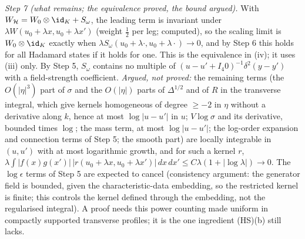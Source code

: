 \emph{Step 7 (what remains; the equivalence proved, the bound argued).} With $W_{\mathcal{H}} = W_{0}\otimes\id_{K} + S_{\omega}$, the leading term is invariant under $\lambda W(u_{0} + \lambda x, u_{0} + \lambda x')$ (weight $\tfrac12$ per leg; computed), so the scaling limit is $W_{0}\otimes\id_{K}$ exactly when $\lambda S_{\omega}(u_{0} + \lambda\cdot, u_{0} + \lambda\cdot) \to 0$, and by Step 6 this holds for all Hadamard states if it holds for one. This is the equivalence in (iv); it uses (iii) only. By Step 5, $S_{\omega}$ contains no multiple of $(u - u' + I_{4}0)^{-1}\delta^{2}(y - y')$ with a field-strength coefficient. \emph{Argued, not proved:} the remaining terms (the $O(|\eta|^{3})$ part of $\sigma$ and the $O(|\eta|)$ parts of $\Delta^{1/2}$ and of $R$ in the transverse integral, which give kernels homogeneous of degree $\ge -2$ in $\eta$ without a derivative along $k$, hence at most $\log|u - u'|$ in $u$; $V\log\sigma$ and its derivative, bounded times $\log$; the mass term, at most $\log|u - u'|$; the log-order expansion and connection terms of Step 5; the smooth part) are locally integrable in $(u, u')$ with at most logarithmic growth, and for such a kernel $r$, $\lambda\int|f(x)g(x')|\,|r(u_{0} + \lambda x, u_{0} + \lambda x')|\,dx\,dx' \le C\lambda(1 + |\log\lambda|) \to 0$. The $\log\epsilon$ terms of Step 5 are expected to cancel (consistency argument: the generator field is bounded, given the characteristic-data embedding, so the restricted kernel is finite; this controls the kernel defined through the embedding, not the regularised integral). A proof needs this power counting made uniform in compactly supported transverse profiles; it is the one ingredient (HS)(b) still lacks.

